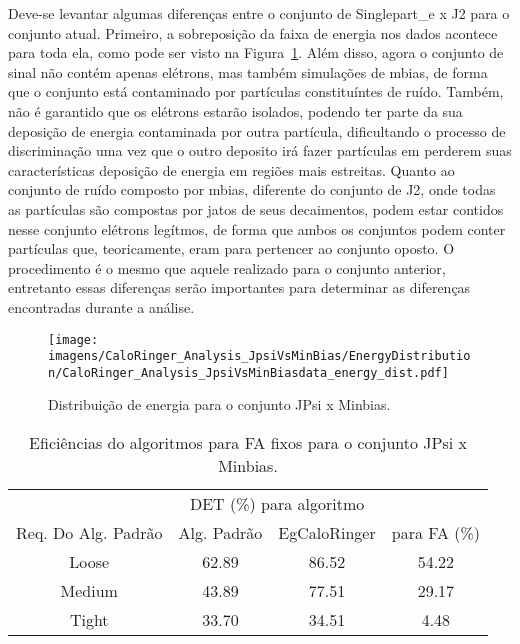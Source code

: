 Deve-se levantar algumas diferenças entre o conjunto de Singlepart\_e x J2 para
o conjunto atual. Primeiro, a sobreposição da faixa de energia nos dados
acontece para toda ela, como pode ser visto na
Figura~\ref{fig:jpsixminb_dist_energia}. Além disso, agora o conjunto de sinal
não contém apenas elétrons, mas também simulações de \gls{mbias}, de forma que o
conjunto está contaminado por partículas constituíntes de ruído. Também, não é
garantido que os elétrons estarão isolados, podendo ter parte da sua deposição
de energia contaminada por outra partícula, dificultando o processo de
discriminação uma vez que o outro deposito irá fazer partículas \gls{em}
perderem suas características deposição de energia em regiões mais estreitas.
Quanto ao conjunto de ruído composto por \gls{mbias}, diferente do conjunto de
J2, onde todas as partículas são compostas por jatos de seus decaimentos, podem
estar contidos nesse conjunto elétrons legítmos, de forma que ambos os conjuntos
podem conter partículas que, teoricamente, eram para pertencer ao conjunto
oposto. O procedimento é o mesmo que aquele realizado para o conjunto anterior, entretanto
essas diferenças serão importantes para determinar as diferenças encontradas
durante a análise.

\begin{figure}[ht]
\centering
\texttt{[image: imagens/CaloRinger\_Analysis\_JpsiVsMinBias/EnergyDistribution/CaloRinger\_Analysis\_JpsiVsMinBiasdata\_energy\_dist.pdf]}
\label{fig:jpsixminb_dist_energia}
\caption{Distribuição de energia para o conjunto JPsi x Minbias.}
\end{figure}

\begin{table}[htb]
\centering
\begin{tabular}{cccc}
\hline
\hline
 & 
\multicolumn{2}{c}{DET (\%) para algoritmo} & 
\\
\cline{2-3}
\multirow{-2}{*}{Req. Do Alg. Padrão} & 
Alg. Padrão & 
EgCaloRinger & 
\multirow{-2}{*}{para FA (\%)} \\
\hline
Loose  & 62.89 & 86.52 & 54.22\\
Medium & 43.89 & 77.51 & 29.17\\
Tight  & 33.70 & 34.51 & 4.48 \\
\hline
\hline
\end{tabular}
\caption{Eficiências do algoritmos para FA fixos para o conjunto JPsi x Minbias.}
\label{tab:jpsixminb_efic}
\end{table}


